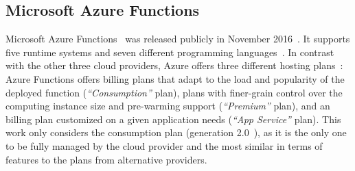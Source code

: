\subsection{Microsoft Azure Functions}
\label{sec:ss:azure}

Microsoft Azure Functions~\cite{AzureFunctions} was released publicly in November 2016~\cite{AzureFunctionsAnnouncement}. %
It supports five runtime systems and seven different programming languages~\cite{AzureFunctionsLanguages}.
In contrast with the other three cloud providers, Azure offers three different hosting plans~\cite{AzureFunctionsPlans}:
Azure Functions offers billing plans that adapt to the load and popularity of the deployed function (\emph{``Consumption''} plan), plans with finer-grain control over the computing instance size and pre-warming support (\emph{``Premium''} plan), and an billing plan customized on a given application needs (\emph{``App Service''} plan). 
This work only considers the consumption plan (generation 2.0~\cite{AzureFunctionsGenerations}), as it is the only one to be fully managed by the cloud provider and the most similar in terms of features to the plans from alternative providers. 

